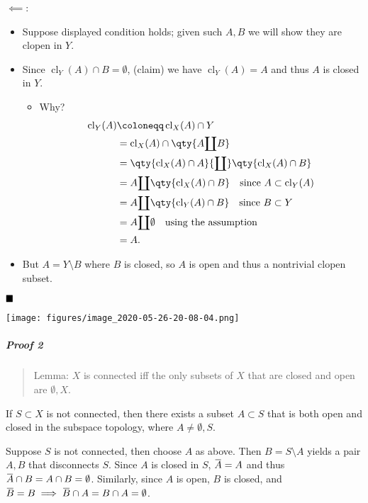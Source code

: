 \begin{solution}
\(\impliedby\):

\begin{itemize}
\tightlist
\item
  Suppose displayed condition holds; given such \(A, B\) we will show
  they are clopen in \(Y\).
\item
  Since \(\operatorname{cl}_Y(A) \cap B = \emptyset\), (claim) we have
  \(\operatorname{cl}_Y(A) = A\) and thus \(A\) is closed in \(Y\).

  \begin{itemize}
  \tightlist
  \item
    Why?
    \begin{align*}     \operatorname{cl}_Y(A) &\coloneqq\operatorname{cl}_X(A) \cap Y \\      &= \operatorname{cl}_X(A) \cap\qty{A{\coprod}B} \\      &= \qty{\operatorname{cl}_X(A) \cap A} {\coprod}\qty{\operatorname{cl}_X(A) \cap B} \\     &= A  {\coprod}\qty{\operatorname{cl}_X(A) \cap B}      \quad\text{since } A \subset \operatorname{cl}_Y(A) \\     &= A {\coprod}\qty{\operatorname{cl}_Y(A) \cap B}      \quad \text{since } B \subset Y \\     &= A {\coprod}\emptyset \quad\text{using the assumption} \\     &= A     .\end{align*}
  \end{itemize}
\item
  But \(A = Y\setminus B\) where \(B\) is closed, so \(A\) is open and
  thus a nontrivial clopen subset.
\end{itemize}

\(\hfill\blacksquare\)

\texttt{[image: figures/image\_2020-05-26-20-08-04.png]}

\hypertarget{proof-2-2}{%
\subparagraph{Proof 2}\label{proof-2-2}}

\begin{quote}
Lemma: \(X\) is connected iff the only subsets of \(X\) that are closed
and open are \(\emptyset, X\).
\end{quote}

If \(S\subset X\) is not connected, then there exists a subset
\(A\subset S\) that is both open and closed in the subspace topology,
where \(A\neq \emptyset, S\).

Suppose \(S\) is not connected, then choose \(A\) as above. Then
\(B = S\setminus A\) yields a pair \(A, B\) that disconnects \(S\).
Since \(A\) is closed in \(S\),
\(\mkern 1.5mu\overline{\mkern-1.5muA\mkern-1.5mu}\mkern 1.5mu = A\) and
thus
\(\mkern 1.5mu\overline{\mkern-1.5muA\mkern-1.5mu}\mkern 1.5mu \cap B = A \cap B = \emptyset\).
Similarly, since \(A\) is open, \(B\) is closed, and
\(\mkern 1.5mu\overline{\mkern-1.5muB\mkern-1.5mu}\mkern 1.5mu = B \implies \mkern 1.5mu\overline{\mkern-1.5muB\mkern-1.5mu}\mkern 1.5mu \cap A = B \cap A = \emptyset\).

\end{solution}

